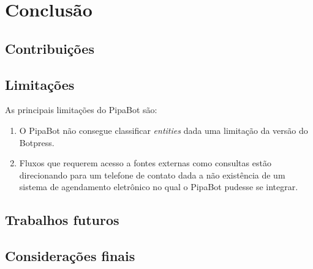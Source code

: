   \chapter{Conclusão}
  
  \section{Contribuições}
  
  \section{Limitações}
  As principais limitações do PipaBot são:
  \begin{enumerate}
  	\item O PipaBot não consegue classificar \textit{entities} dada uma limitação da versão do Botpress.
  	\item Fluxos que requerem acesso a fontes externas como consultas estão direcionando para um telefone de contato dada a não existência de um sistema de agendamento eletrônico no qual o PipaBot pudesse se integrar.
  \end{enumerate}
  \section{Trabalhos futuros}
  
  \section{Considerações finais}